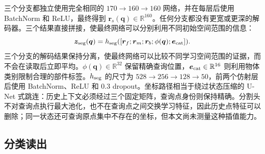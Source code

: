 \documentclass[UTF8,a4paper,11pt,fontset=windows]{ctexart}
\newcommand{\R}{\mathbb{R}}
\begin{document}
三个分支都独立使用完全相同的 $170\rightarrow160\rightarrow160$ 网络，并在每层后使用 BatchNorm 和 ReLU，最终得到 $\bm r_s(\bm q)\in\R^{160}$。任何分支都没有更宽或更深的解码器。三个结果直接拼接，使最终网络可以分别利用不同初始空间范围的信息：
\begin{equation}
\bm z_{\rm seg}(\bm q)=h_{\rm seg}([\bm r_f;\bm r_m;\bm r_b;\phi(\bm q);\bm e_{\rm cat}]).
\label{eq:seg}
\end{equation}
三个分支的解码结果保持分离，使最终网络可以比较不同学习空间范围的证据，而不会在读取后立即平均。$\phi(\bm q)\in\R^{32}$ 保留精确查询位置，$\bm e_{\rm cat}\in\R^{16}$ 则利用物体类别限制合理的部件标签。$h_{\rm seg}$ 的尺寸为 $528\rightarrow256\rightarrow128\rightarrow50$，前两个仿射层后使用 BatchNorm、ReLU 和 0.3 dropout。坐标路径相当于绕过状态压缩的 U-Net 式跳连：历史上下文必须经过三个固定矩阵，查询点身份则保持精确。分割头不对查询点执行最大池化，也不在查询点之间交换学习特征，因此历史点特征可以删除；同一状态还可查询原点集中不存在的坐标，但本文尚未测量这种插值能力。

\subsection{分类读出}
\end{document}
